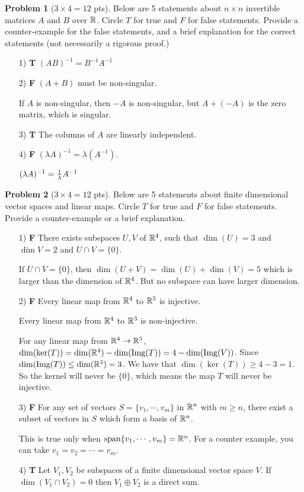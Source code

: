 \documentclass[12pt]{amsart}
\theoremstyle{definition}
\newtheorem{prob}{Problem}
\newcommand{\blu}[1]{{\color{blue}#1}}
\begin{document}
\begin{prob}[$3\times 4 = 12$ pts]
	Below are 5 statements about $n\times n$ invertible matrices $A$ and $B$ over $\mathbb{R}$. Circle $T$ for true and $F$ for false statements. Provide a counter-example for the false statements, and a brief explanation for the correct statements (not necessarily a rigorous proof.) \begin{enumerate}
	\item[1)  {\bf T}]\quad $(AB)^{-1}=B^{-1}A^{-1}$
	
	\item[2)  {\bf F}]\quad  $(A+B)$ must be non-singular.
	
\blu{If $A$ is non-singular, then $-A$ is non-singular, but $A+(-A)$ is the zero matrix, which is singular.}
		\item[3)  {\bf T}]\quad The columns of $A$ are linearly independent.

	\item[4)  {\bf F}]\quad $(\lambda A)^{-1}=\lambda (A^{-1})$.
	
	\blu{$ (\lambda A)^{-1}={1\over\lambda}A^{-1}$}
\end{enumerate}
\end{prob}

\begin{prob}[$3\times 4 = 12$ pts]
	Below are 5 statements about finite dimensional vector spaces and linear maps. Circle $T$ for true and $F$ for false statements. Provide a counter-example or a brief explanation.
	\begin{enumerate}
		\item[1)  {\bf F}]\quad There exists subspaces $U,V$ of $\mathbb{R}^4$, such that $\dim(U)=3$ and $\dim V=2$ and $U\cap V=\{0\}$. 
		
		\blu{If $U\cap V=\{0\}$, then $\dim(U+V)=\dim(U)+\dim(V)=5$ which is larger than the dimension of $\mathbb{R}^4$. But no subspace can have larger dimension.}
\item[2)  {\bf  F}]\quad  Every linear map from $\mathbb{R}^4$ to $\mathbb{R}^3$ is injective.

\blu{ Every linear map from $\mathbb{R}^4$ to $\mathbb{R}^3$ is non-injective.

For any linear map from $\mathbb{R}^4\to\mathbb{R}^3$, $\dim(\ker(T))=\dim(\mathbb{R}^4)-\dim(\text{Img}(T))=4-\dim(\text{Img}(V))$. Since $\dim(\text{Img}(T))\leq \dim(\mathbb{R}^3)=3$. We have that $\dim(\ker(T))\geq 4-3=1$. So the kernel will never be $\{0\}$, which means the map $T$ will never be injective.}
\item[3)  {\bf   F}]\quad  For any set of vectors $S=\{v_1,\cdots,v_m\}$ in $\mathbb{R}^n$ with $m\geq n$, there exist a subset of vectors in $S$ which form a basis of $\mathbb{R}^n$.

\blu{This is true only when $\operatorname{span}\{v_1,\cdots,v_m\}=\mathbb{R}^n$. For a counter example, you can take $v_1=v_2=\cdots=v_m$.}
\item[4)  {\bf T}]\quad  Let $V_1,V_2$ be subspaces of a finite dimensional vector space $V$. If $\dim(V_1\cap V_2)=0$ then $V_1\oplus V_2$ is a direct sum.
	\end{enumerate}
\end{prob}
\end{document}
